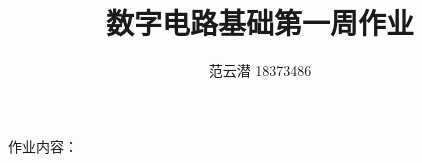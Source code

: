 \documentclass[lang=cn,11pt,a4paper,cite=authoryear]{elegantpaper}
\title{数字电路基础\quad 第一周作业}
\author{范云潜 18373486}
\institute{微电子学院 184111 班}
\date{\zhtoday}
\begin{document}
\maketitle

作业内容：



\end{document}
